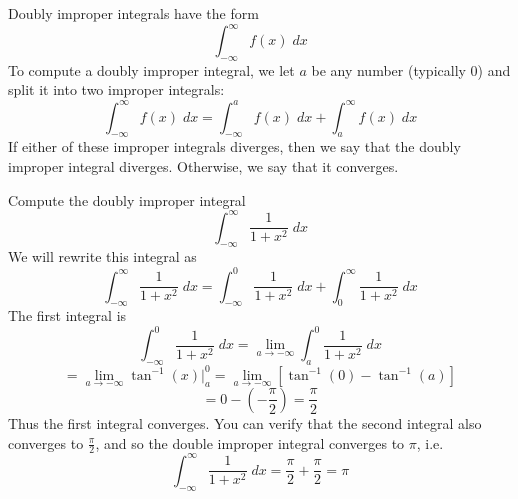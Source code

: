 \documentclass[handout]{ximera}
\begin{document}
Doubly improper integrals have the form 
\[
\int_{-\infty}^\infty f(x) \; dx
\]
To compute a doubly improper integral, we let $a$ be any number (typically 0) and split it into two improper integrals:
\[
\int_{-\infty}^\infty f(x) \; dx = \int_{-\infty}^a f(x) \; dx + \int_a^\infty f(x) \; dx
\]
If either of these improper integrals diverges, then we say that the doubly improper integral diverges.
Otherwise, we say that it converges.

\begin{example}[example 9]
Compute the doubly improper integral
\[
\int_{-\infty}^\infty \frac{1}{1+x^2} \; dx
\]
We will rewrite this integral as
\[
\int_{-\infty}^\infty \frac{1}{1+x^2} \; dx = \int_{-\infty}^0 \frac{1}{1+x^2} \; dx + \int_0^\infty \frac{1}{1+x^2} \; dx
\] 
The first integral is
\[
\int_{-\infty}^0 \frac{1}{1+x^2} \; dx = \lim_{a \to -\infty} \int_{a}^0 \frac{1}{1+x^2} \; dx
\]
\[
= \lim_{a \to -\infty} \tan^{-1}(x) \bigg|_a^0 = \lim_{a \to -\infty} \left[\tan^{-1}(0) - \tan^{-1}(a)\right]
\]
\[
= 0 - \left(-\frac{\pi}{2}\right) = \frac{\pi}{2}
\]
Thus the first integral converges. You can verify that the second integral also converges to $\frac{\pi}{2}$,
and so the double improper integral converges to $\pi$, i.e.
\[
\int_{-\infty}^\infty \frac{1}{1+x^2} \; dx = \frac{\pi}{2} + \frac{\pi}{2} = \pi
\]

\end{example}


                    
\begin{center}
\begin{foldable}
\end{foldable}
\end{center}
\end{document}
